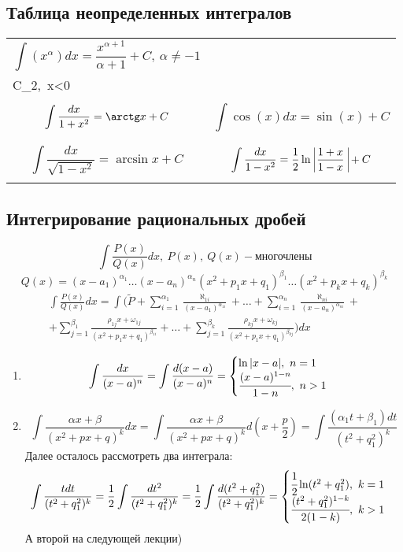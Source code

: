 \subsection{Таблица неопределенных интегралов}
    \begin{tabular}{p{7.5cm}|p{}}
        \toprule
        \[\int(x^\alpha)dx = \frac{x^{\alpha + 1}}{\alpha + 1} + C, \ \alpha \neq -1\] & \[\int\frac{dx}{x} = ln|x| + \begin{cases}C_1,\ x>0\\C_2,\ x<0\end{cases}\] \\
        \midrule
        \[\int\frac{dx}{1 + x^2} = \arctg x + C\] & \[\int \cos(x)dx = \sin(x) + C\] \\
        \midrule
        \[\int\frac{dx}{\sqrt{1 - x^2}} = \arcsin x + C\] & \[\int\frac{dx}{1 - x^2} = \frac{1}{2}\ln\ \vline\frac{1+x}{1-x}\ \vline + C\] \\
        \bottomrule
    \end{tabular}
\subsection{Интегрирование рациональных дробей}
\[\int\frac{P(x)}{Q(x)}dx,\ P(x),\ Q(x) - \text{многочлены}\]
\[Q(x) = (x-a_1)^{\alpha_1}\dots(x-a_n)^{\alpha_n}(x^2+p_1x+q_1)^{\beta_1}\dots(x^2+p_kx+q_k)^{\beta_k}\]
\begin{multline*}
    \int\frac{P(x)}{Q(x)}dx = \int(\tilde{P} + \sum \limits_{i=1}^{\alpha_1}\frac{\aleph_{1i}}{(x-a_1)^{\alpha_{1i}}} +\dots+ \sum \limits_{i=1}^{\alpha_n}\frac{\aleph_{ni}}{(x-a_n)^{\alpha_{ni}}} + \\
    + \sum \limits_{j=1}^{\beta_1}\frac{\rho_{1j}x + \omega_{1j}}{(x^2+p_1x+q_1)^{\beta_{1i}}} + \dots + \sum \limits_{j=1}^{\beta_k}\frac{\rho_{kj}x + \omega_{kj}}{(x^2+p_1x+q_1)^{\beta_{kj}}}) dx
\end{multline*}
\begin{enumerate}
    \item \[\int\frac{dx}{(x-a)^n} = \int\frac{d(x-a)}{(x-a)^n} = \begin{cases}\ln|x-a|,\ n = 1\\ \cfrac{(x-a)^{1-n}}{1-n}, \ n > 1\end{cases}\]
    \item \[\int\frac{\alpha x+\beta}{(x^2+px+q)^k}dx = \int\frac{\alpha x+\beta}{(x^2+px+q)^k}d(x+\frac{p}{2}) = \int\frac{(\alpha_1 t+\beta_1)dt}{(t^2+q_1^2)^k}\]
    Далее осталось рассмотреть два интеграла:
    \[\int\frac{tdt}{(t^2+q_1^2)^k} = \frac{1}{2}\int\frac{dt^2}{(t^2+q_1^2)^k} = \frac{1}{2}\int\frac{d(t^2+q_1^2)}{(t^2+q_1^2)^k} = \begin{cases}\cfrac{1}{2}\ln(t^2+q_1^2),\ k = 1\\ \cfrac{(t^2+q_1^2)^{1-k}}{2(1-k)}, \ k > 1\end{cases}\]
    А второй на следующей лекции)
\end{enumerate}